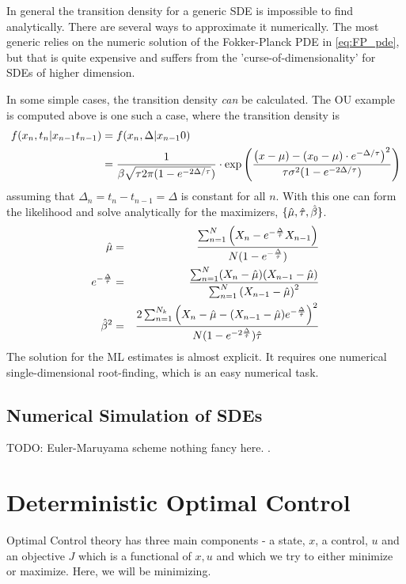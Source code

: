 In general the transition density for a generic SDE is impossible to find
analytically. There are several ways to approximate it numerically. The most
generic relies on the numeric solution of the Fokker-Planck PDE in
\cref{eq:FP_pde}, but that is quite expensive and suffers from the
'curse-of-dimensionality' for SDEs of higher dimension. 

In some simple cases, the transition density {\sl can} be calculated. The OU
example is computed above is one such a case, where the transition density is
\begin{align*}
f(x_n, t_n| x_{n-1} t_{n-1}) &=
 f(x_n, \Delta| x_{n-1} 0)\\& =
 \frac{1}{ \beta \sqrt{{ \tau } 2\pi(1 -  e^{-2 \Delta/{ \tau }}})}
 	\cdot \exp\left(\frac{\left( x - \mu)  - (x_{0} - \mu) \cdot
 	 e^{-\Delta/{ \tau }} \right)^2  } {{\tau} \sigma^2  (1-e^{-2 \Delta/{ \tau }})}
 	\right) 
\end{align*}
assuming that $\Delta_n = t_n-t_{n-1} = \Delta$ is constant for all $n$.
With this one can form the likelihood and solve analytically for the
maximizers, $\{\hat{{\mu }} , \hat{{ \tau }}, \hat{\beta} \}$.
\begin{eqnarray} 
\hat{ \mu} &=& 
\frac{  \sum_{n=1}^{N } 
     \left( X_n - e^{-\frac{\Delta} {\hat {{ \tau }}}} X_{n-1} \right)} 
	 { N( 1-e^{-\frac {\Delta} {\hat {{ \tau }}}}) }
\\
e^{-\frac {\Delta}{\hat{{ \tau }}} } &=& 
\frac { \sum_{n=1}^{N} 
			( X_n -  \hat \mu)(X_{n-1} -  \hat \mu) }
    {   \sum_{n=1}^{N } \left( X_{n-1} - \hat \mu
    \right)^2 }
\\
\hat\beta^2 &=&  
\frac{ 2  \sum_{n=1}^{N_k}  \left( X_n - \hat \mu - (X_{n-1} -
\hat \mu) e^{-\frac {\Delta} {\hat {{ \tau }}}} \right)^2 } 
	  { N (1-e^{-2\frac {\Delta} {\hat {{ \tau }}}}) \hat {{ \tau }}}
\end{eqnarray}
The solution for the ML estimates is almost explicit. It requires one numerical
single-dimensional root-finding, which is an easy numerical task.

\subsection{Numerical Simulation of SDEs}
TODO: Euler-Maruyama scheme nothing fancy here. \cite{Higham2001}.


\section{Deterministic Optimal Control}
\label{sec:deterministic_control}
Optimal Control theory has three main components - a state, $x$, a control, $u$
and an objective $J$ which is a functional of $x,u$ and which we try to either
minimize or maximize. Here, we will be minimizing.

